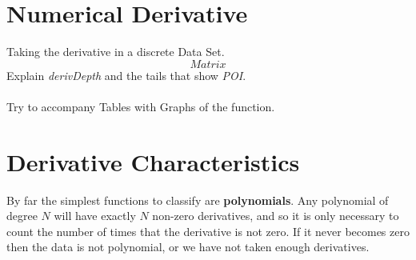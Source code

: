 \documentclass[main.tex]{subfiles}
\begin{document}
      
  \section{Numerical Derivative}
    
    Taking the derivative in a discrete Data Set.
    \[Matrix\]
    Explain \textit{derivDepth} and the tails that show \textit{POI}.
    \\\\
    Try to accompany Tables with Graphs of the function.
  
  \section{Derivative Characteristics}
    
    By far the simplest functions to classify are \textbf{polynomials}. Any polynomial of degree $N$ will have exactly $N$ non-zero derivatives, and so it is only necessary to count the number of times that the derivative is not zero. If it never becomes zero then the data is not polynomial, or we have not taken enough derivatives.
          
\end{document}

